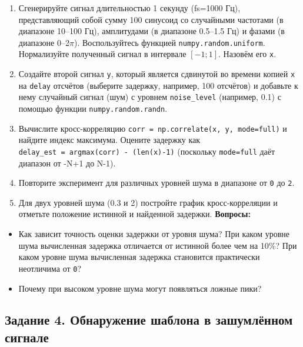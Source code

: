 \documentclass[12pt,a4paper,openany]{book}
\providecommand{\tightlist}{\setlength{\itemsep}{0pt}\setlength{\parskip}{0pt}}
\begin{document}
\begin{enumerate}
\def\labelenumi{\arabic{enumi}.}
\tightlist
\item
  Сгенерируйте сигнал длительностью 1 секунду (fs=1000 Гц), представляющий собой сумму 100 синусоид со случайными частотами (в диапазоне 10--100 Гц), амплитудами (в диапазоне 0.5--1.5 Гц) и фазами (в диапазоне 0--2\(\pi\)). Воспользуйтесь функцией \texttt{numpy.\allowbreak{}random.\allowbreak{}uniform}. Нормализуйте полученный сигнал в интервале \([-1;1]\). Назовём его \texttt{x}.
\item
  Создайте второй сигнал \texttt{y}, который является сдвинутой во времени копией \texttt{x} на \texttt{delay} отсчётов (выберите задержку, например, 100 отсчётов) и добавьте к нему случайный сигнал (шум) с уровнем \texttt{noise\_\allowbreak{}level} (например, 0.1) с помощью функции \texttt{numpy.\allowbreak{}random.\allowbreak{}randn}.
\item
  Вычислите кросс-корреляцию \texttt{corr\ =\allowbreak{}\ np.\allowbreak{}correlate(\allowbreak{}x,\allowbreak{}\ y,\allowbreak{}\ mode=\allowbreak{}\textquotesingle{}\allowbreak{}full\textquotesingle{}\allowbreak{})} и найдите индекс максимума. Оцените задержку как \texttt{delay\_\allowbreak{}est\ =\allowbreak{}\ argmax(\allowbreak{}corr)\ -\ (\allowbreak{}len(\allowbreak{}x)-1)} (поскольку \texttt{mode=\allowbreak{}\textquotesingle{}\allowbreak{}full\textquotesingle{}\allowbreak{}} даёт диапазон от -N+1 до N-1).
\item
  Повторите эксперимент для различных уровней шума в диапазоне от \texttt{0} до \texttt{2}.
\item
  Для двух уровней шума (0.3 и 2) постройте график кросс-корреляции и отметьте положение истинной и найденной задержки.
  \textbf{Вопросы:}
\end{enumerate}

\begin{itemize}
\tightlist
\item
  Как зависит точность оценки задержки от уровня шума? При каком уровне шума вычисленная задержка отличается от истинной более чем на 10\%? При каком уровне шума вычисленная задержка становится практически неотличима от \texttt{0}?
\item
  Почему при высоком уровне шума могут появляться ложные пики?
\end{itemize}

\subsection*{Задание 4. Обнаружение шаблона в зашумлённом сигнале}
\end{document}
